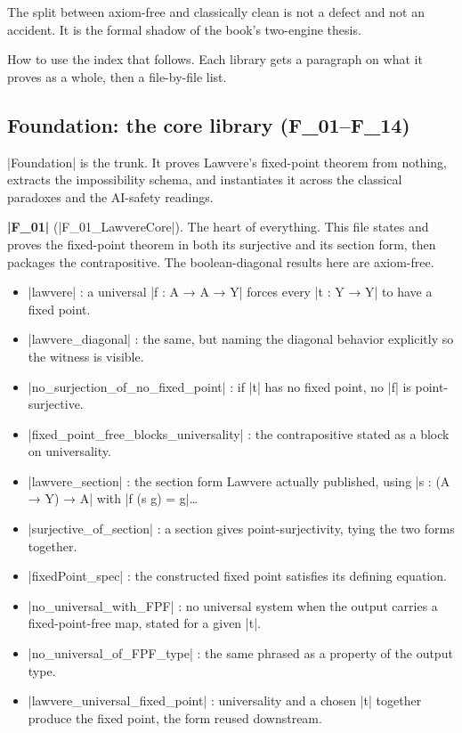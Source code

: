 \documentclass{memoir}
\begin{document}
The split between axiom-free and classically clean is not a defect and not an
accident. It is the formal shadow of the book's two-engine thesis.

How to use the index that follows. Each library gets a paragraph on what it proves
as a whole, then a file-by-file list.



\subsection{Foundation: the core library (F\_01–F\_14)}\label{Two--Schemas--of--Impossibility-005F-005F-005F--Machine--Checked--Limits--of--Trustworthy--Machine--Learning-005F-005F-005F--and--Why--They--Tighten--with--Capability----Appendices----The--Formal--Corpus----Foundation-005F-005F-005F--the--core--library---005FLPAR-005FF-005F01-005F-005F-005FF-005F14-005FRPAR-005F}

\LeanVerb|Foundation| is the trunk. It proves Lawvere's fixed-point theorem from nothing,
extracts the impossibility schema, and instantiates it across the classical
paradoxes and the AI-safety readings.

\textbf{\LeanVerb|F_01|} (\LeanVerb|F_01_LawvereCore|). The heart of everything. This file states and proves
the fixed-point theorem in both its surjective and its section form, then packages
the contrapositive. The boolean-diagonal results here are axiom-free.

\begin{itemize}
\item \LeanVerb|lawvere| : a universal \LeanVerb|f : A → A → Y| forces every \LeanVerb|t : Y → Y| to have a fixed
   point.
\item \LeanVerb|lawvere_diagonal| : the same, but naming the diagonal behavior explicitly so the
   witness is visible.
\item \LeanVerb|no_surjection_of_no_fixed_point| : if \LeanVerb|t| has no fixed point, no \LeanVerb|f| is
   point-surjective.
\item \LeanVerb|fixed_point_free_blocks_universality| : the contrapositive stated as a block on
   universality.
\item \LeanVerb|lawvere_section| : the section form Lawvere actually published, using \LeanVerb|s : (A → Y) → A|
   with \LeanVerb|f (s g) = g|…
\item \LeanVerb|surjective_of_section| : a section gives point-surjectivity, tying the two forms
   together.
\item \LeanVerb|fixedPoint_spec| : the constructed fixed point satisfies its defining equation.
\item \LeanVerb|no_universal_with_FPF| : no universal system when the output carries a
   fixed-point-free map, stated for a given \LeanVerb|t|.
\item \LeanVerb|no_universal_of_FPF_type| : the same phrased as a property of the output type.
\item \LeanVerb|lawvere_universal_fixed_point| : universality and a chosen \LeanVerb|t| together produce
   the fixed point, the form reused downstream.

\end{itemize}
\end{document}
